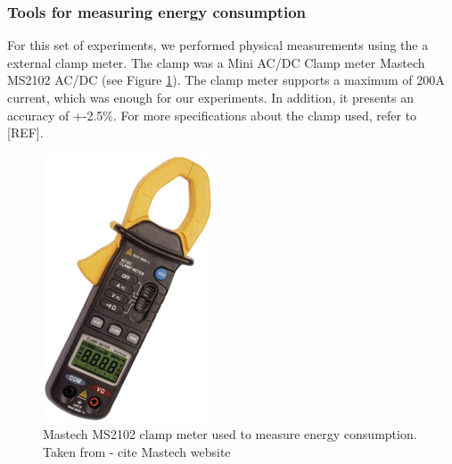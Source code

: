 \subsubsection*{Tools for measuring energy consumption}
For this set of experiments, we performed physical measurements using the a external clamp meter. The clamp was a Mini AC/DC Clamp meter
Mastech MS2102 AC/DC (see Figure \ref{fig:clamp}). The clamp meter supports a maximum of 200A current, which was enough for our experiments. In addition, it presents an accuracy of +-2.5\%. For more specifications about the clamp used, refer to [REF].

\begin{figure}[]
  \centering
    \includegraphics[scale=2.5]{"img/clamp"}
    \caption{Mastech MS2102 clamp meter used to measure energy consumption. Taken from \cite{} - cite Mastech website}
    \label{fig:clamp}
\end{figure}




